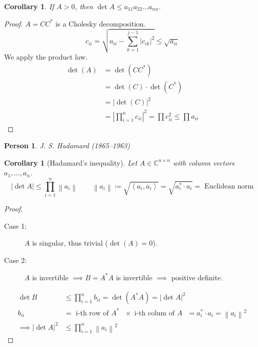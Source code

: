 \documentclass[a4paper]{article}
\newcounter{lecref}[section]
\numberwithin{lecref}{section}
\newtheorem{corollary}[lecref]{Corollary}
\newtheorem*{Person}{Person}
\newcommand{\angel}[1]{\left\langle#1\right\rangle}
\newcommand{\norm}[1]{\left\|#1\right\|}
\newcommand{\card}[1]{\left|#1\right|}
\begin{document}
\begin{corollary} %
  If $A > 0$, then $\det{A} \leq a_{11} a_{22} \dots a_{nn}$.
\end{corollary}

\begin{proof}
  $A = CC^*$ is a Cholesky decomposition.
  \[ c_{ii} = \sqrt{a_{ii} - \sum_{k=1}^{j-1} \card{c_{ik}}^2} \leq \sqrt{a_{ii}} \]
  We apply the product law.
  \begin{align*}
    \det(A) &= \det(C C^*) \\
      &= \det(C) \cdot \det(C^*) \\
      &= \card{\det(C)}^2 \\
      &= \card{\prod_{i=1}^n c_{ii}}^2 = \prod c_{ii}^2 \leq \prod a_{ii}
  \end{align*}
\end{proof}

\begin{Person}
  J. S. Hadamard (1865--1963)
\end{Person}

\begin{corollary}[Hadamard's inequality] %
  Let $A \in \mathbb C^{n \times n}$ with column vectors $a_1, \dots, a_n$.
  \[
    \card{\det{A}} \leq \prod_{i=1}^n \norm{a_{i}} \qquad
    \norm{a_i} \coloneqq \sqrt{\angel{a_i, a_i}} = \sqrt{a_i^* \cdot a_i} = \text{ Euclidean norm}
  \]
\end{corollary}

\begin{proof}
  \begin{description}
    \item[Case 1:] $A$ is singular, thus trivial ($\det(A) = 0$).
    \item[Case 2:] $A$ is invertible $\implies B = A^* A$ is invertible $\implies$ positive definite.
  \end{description}%
  \begin{align*}
    \det{B} &\leq \prod_{i=1}^n b_{ii} = \det(A^* A) = \card{\det{A}}^2 \\
    b_{ii}  &= \text{ i-th row of $A^*$ } \times \text{ i-th colum of $A$ } = a_i^* \cdot a_i = \norm{a_i}^2 \\
    \implies \card{\det{A}}^2 &\leq \prod_{i=1}^n \norm{a_i}^2
  \end{align*}
\end{proof}
\end{document}
